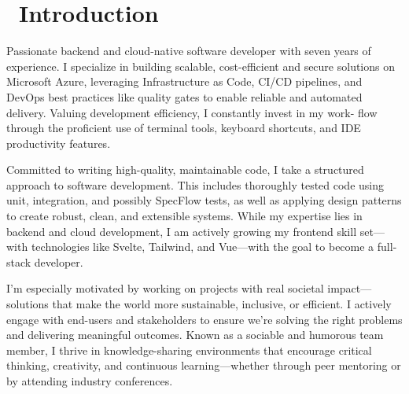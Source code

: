 \section{\faUser\ Introduction}
Passionate backend and cloud-native software developer with seven years of experience. I specialize in building scalable, cost-efficient and secure solutions on Microsoft Azure, leveraging Infrastructure as Code, CI/CD pipelines, and DevOps best practices like quality gates to enable reliable and automated delivery. Valuing development efficiency, I constantly invest in my work-
flow through the proficient use of terminal tools, keyboard shortcuts, and IDE productivity
features.

Committed to writing high-quality, maintainable code, I take a structured approach to software development. This includes thoroughly tested code using unit, integration, and possibly SpecFlow tests, as well as applying design patterns to create robust, clean, and extensible systems. While my expertise lies in backend and cloud development, I am actively growing my frontend skill set—with technologies like Svelte, Tailwind, and Vue—with the goal to become a full-stack developer.

I’m especially motivated by working on projects with real societal impact—solutions that make the world more sustainable, inclusive, or efficient. I actively engage with end-users and stakeholders to ensure we’re solving the right problems and delivering meaningful outcomes. Known as a sociable and humorous team member, I thrive in knowledge-sharing environments that encourage critical thinking, creativity, and continuous learning—whether through peer mentoring or by attending industry conferences.
